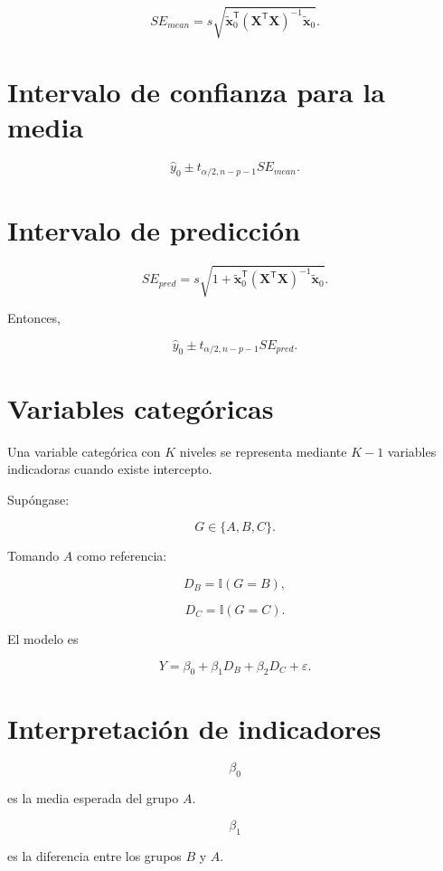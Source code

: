 \documentclass[
  spanish,
  11pt,
  letterpaper,
  DIV=11,
  numbers=noendperiod]{scrreprt}
\theoremstyle{definition}
\theoremstyle{plain}
\theoremstyle{definition}
\theoremstyle{remark}
\begin{document}
\[
SE_{mean}
=
s
\sqrt{
\widetilde{\mathbf{x}}_0^{\mathsf T}
(\mathbf{X}^{\mathsf T}\mathbf{X})^{-1}
\widetilde{\mathbf{x}}_0
}.
\]

\section{Intervalo de confianza para la
media}\label{intervalo-de-confianza-para-la-media-1}

\[
\widehat{y}_0
\pm
t_{\alpha/2,n-p-1}
SE_{mean}.
\]

\section{Intervalo de predicción}\label{intervalo-de-predicciuxf3n-1}

\[
SE_{pred}
=
s
\sqrt{
1+
\widetilde{\mathbf{x}}_0^{\mathsf T}
(\mathbf{X}^{\mathsf T}\mathbf{X})^{-1}
\widetilde{\mathbf{x}}_0
}.
\]

Entonces,

\[
\widehat{y}_0
\pm
t_{\alpha/2,n-p-1}
SE_{pred}.
\]

\section{Variables categóricas}\label{variables-categuxf3ricas-1}

Una variable categórica con \(K\) niveles se representa mediante \(K-1\)
variables indicadoras cuando existe intercepto.

Supóngase:

\[
G
\in
\{
A,B,C
\}.
\]

Tomando \(A\) como referencia:

\[
D_B
=
\mathbb{I}(G=B),
\]

\[
D_C
=
\mathbb{I}(G=C).
\]

El modelo es

\[
Y
=
\beta_0
+
\beta_1D_B
+
\beta_2D_C
+
\varepsilon.
\]

\section{Interpretación de
indicadores}\label{interpretaciuxf3n-de-indicadores}

\[
\beta_0
\]

es la media esperada del grupo \(A\).

\[
\beta_1
\]

es la diferencia entre los grupos \(B\) y \(A\).
\end{document}
